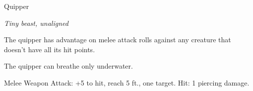 \begin{monsterbox}{Quipper}
\begin{hangingpar}
\textit{Tiny beast, unaligned}
\end{hangingpar}
\dndline%
\basics[%
armorclass = 13,
hitpoints = 1d4 - 1,
speed = {swim 40 ft.}
]
\dndline%
\stats[%
STR = \stat{2},
DEX = \stat{16},
CON = \stat{9},
INT = \stat{1},
WIS = \stat{7},
CHA = \stat{2}
]
\dndline%
\details[%
skills={},
damageimmunities={},
savingthrows={},
conditionimmunities={},
damageresistances={},
damagevulnerabilities={},
senses={darkvision 60 ft., passive Perception 8},
challenge=0
]
\dndline%
\begin{monsteraction}
The quipper has advantage on melee attack rolls against any creature that doesn't have all its hit points.
\end{monsteraction}
\begin{monsteraction}
The quipper can breathe only underwater.
\end{monsteraction}
\begin{monsteraction}[Bite]
Melee Weapon Attack: +5 to hit, reach 5 ft., one target. Hit: 1 piercing damage.
\end{monsteraction}
\end{monsterbox}